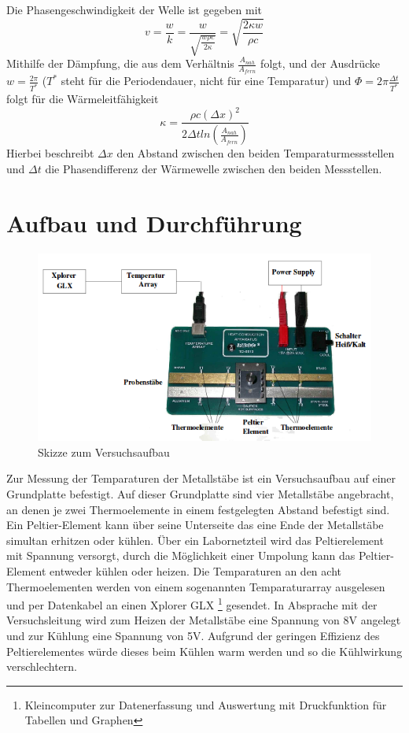 \documentclass[11pt]{article}
\begin{document}
Die Phasengeschwindigkeit der Welle ist gegeben mit
\begin{equation}
v = \frac{w}{k} = \frac{w}{\sqrt{\frac{w \rho c}{2 \kappa}}} = \sqrt{\frac{2 \kappa w}{\rho c}}
\end{equation}
Mithilfe der Dämpfung, die aus dem Verhältnis $\frac{A_{nah}}{A_{fern}}$ folgt, und der Ausdrücke $w = \frac{2 \pi}{T^*}$ ($T^*$ steht für die Periodendauer, nicht für eine Temparatur) und $\Phi = 2 \pi \frac{\Delta t}{T^*}$ folgt für die Wärmeleitfähigkeit
\begin{equation}
\label{kappa}
\kappa = \frac{\rho c (\Delta x)^2}{2 \Delta t ln(\frac{A_{nah}}{A_{fern}})}
\end{equation}
Hierbei beschreibt $\Delta x$ den Abstand zwischen den beiden Temparaturmessstellen und $\Delta t$ die Phasendifferenz der Wärmewelle zwischen den beiden Messstellen.
\section{Aufbau und Durchf\"{u}hrung}
\begin{figure}[htp]
\centering
\includegraphics[width=\textwidth ]{Diagramme/v204aufbau.png}
\caption{Skizze zum Versuchsaufbau}
\label{aufbau}
\end{figure}
Zur Messung der Temparaturen der Metallstäbe ist ein Versuchsaufbau auf einer Grundplatte befestigt. Auf dieser Grundplatte sind vier Metallstäbe angebracht, an denen je zwei Thermoelemente in einem festgelegten Abstand befestigt sind. Ein Peltier-Element kann über seine Unterseite das eine Ende der Metallstäbe simultan erhitzen oder kühlen. Über ein Labornetzteil wird das Peltierelement mit Spannung versorgt, durch die Möglichkeit einer Umpolung kann das Peltier-Element entweder kühlen oder heizen. Die Temparaturen an den acht Thermoelementen werden von einem sogenannten Temparaturarray ausgelesen und per Datenkabel an einen Xplorer GLX \footnote{Kleincomputer zur Datenerfassung und Auswertung mit Druckfunktion für Tabellen und Graphen} gesendet.
In Absprache mit der Versuchsleitung wird zum Heizen der Metallstäbe eine Spannung von 8V angelegt und zur Kühlung eine Spannung von 5V. Aufgrund der geringen Effizienz des Peltierelementes würde dieses beim Kühlen warm werden und so die Kühlwirkung verschlechtern.
\end{document}
